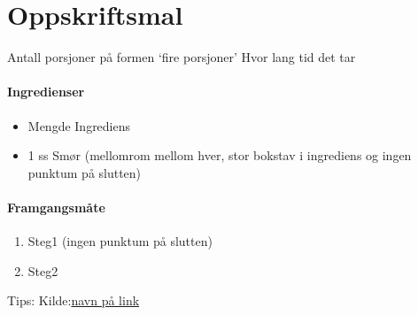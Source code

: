 \section{﻿Oppskriftsmal}
\label{oppskrifsmal}

Antall porsjoner på formen `fire porsjoner'
Hvor lang tid det tar

\paragraph{Ingredienser}
\begin{itemize}[noitemsep]
	\item Mengde Ingrediens
	\item 1 ss Smør (mellomrom mellom hver, stor bokstav i ingrediens og ingen punktum på slutten)
\end{itemize}

\paragraph{Framgangsmåte}
\begin{enumerate}[noitemsep]
	\item Steg1 (ingen punktum på slutten)
	\item Steg2
\end{enumerate}

Tips:
Kilde:\href{https://link}{navn på link}
